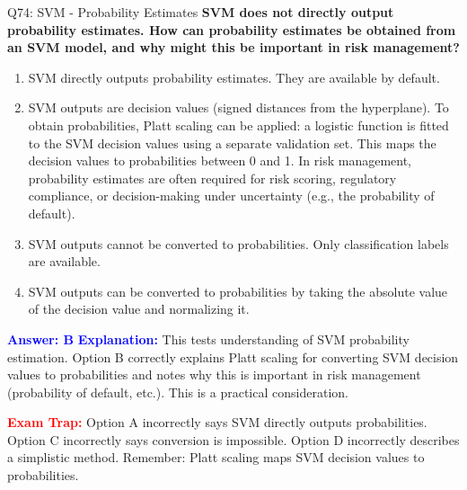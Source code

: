 \documentclass[8pt]{beamer}
\begin{document}
	\begin{frame}{Q74: SVM - Probability Estimates}
		\fontsize{6.5}{7.5}\selectfont
		\textbf{SVM does not directly output probability estimates. How can probability estimates be obtained from an SVM model, and why might this be important in risk management?}
		
		\begin{enumerate}
			\item SVM directly outputs probability estimates. They are available by default.
			\item SVM outputs are decision values (signed distances from the hyperplane). To obtain probabilities, Platt scaling can be applied: a logistic function is fitted to the SVM decision values using a separate validation set. This maps the decision values to probabilities between 0 and 1. In risk management, probability estimates are often required for risk scoring, regulatory compliance, or decision-making under uncertainty (e.g., the probability of default).
			\item SVM outputs cannot be converted to probabilities. Only classification labels are available.
			\item SVM outputs can be converted to probabilities by taking the absolute value of the decision value and normalizing it.
		\end{enumerate}
		
		\vspace{0.1cm}
		\textcolor{blue}{\textbf{Answer: B}}
		\vspace{0.1cm}
		\textcolor{blue}{\textbf{Explanation:}} This tests understanding of SVM probability estimation. Option B correctly explains Platt scaling for converting SVM decision values to probabilities and notes why this is important in risk management (probability of default, etc.). This is a practical consideration.
		
		\textcolor{red}{\textbf{Exam Trap:}} Option A incorrectly says SVM directly outputs probabilities. Option C incorrectly says conversion is impossible. Option D incorrectly describes a simplistic method. Remember: Platt scaling maps SVM decision values to probabilities.
	\end{frame}
	
\end{document}
